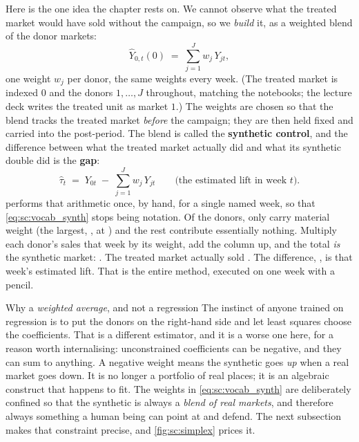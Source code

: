 Here is the one idea the chapter rests on. We cannot observe what the treated market would have
sold without the campaign, so we \emph{build} it, as a weighted blend of the donor markets:
%
\begin{equation}
  \widehat{Y}_{0,t}(0) \;=\; \sum_{j=1}^{J} w_j\, Y_{jt},
  \label{eq:sc:vocab_synth}
\end{equation}
%
one weight $w_j$ per donor, the same weights every week. (The treated market is indexed $0$ and the
donors $1, \dots, J$ throughout, matching the notebooks; the lecture deck writes the treated unit as
market $1$.) The weights are chosen so that the blend
tracks the treated market \emph{before} the campaign; they are then held fixed and carried into
the post-period. The blend is called the \textbf{synthetic control}, and the difference between
what the treated market actually did and what its synthetic double did is the \textbf{gap}:
%
\begin{equation}
  \hat\tau_t \;=\; Y_{0t} \;-\; \sum_{j=1}^{J} w_j\, Y_{jt}
  \qquad\text{(the estimated lift in week } t).
  \label{eq:sc:vocab_gap}
\end{equation}
%
 performs that arithmetic once, by hand, for a single named week, so that
\cref{eq:sc:vocab_synth} stops being notation. Of the \nbSevenNDonors{} donors, only
\nbSevenDcNDonorsUsed{} carry material weight (the largest, \nbSevenDcTopName{}, at
\nbSevenDcTopWeight{}) and the rest contribute essentially nothing. Multiply each donor's sales
that week by its weight, add the column up, and the total \emph{is} the synthetic market:
\keur{\nbSevenDcSynth}. The treated market actually sold \keur{\nbSevenDcActual}. The difference,
\keur{\nbSevenDcGap}, is that week's estimated lift. That is the entire method, executed on one
week with a pencil.



\begin{intuition}{Why a \emph{weighted average}, and not a regression}
The instinct of anyone trained on regression is to put the donors on the right-hand side and let
least squares choose the coefficients. That is a different estimator, and it is a worse one here,
for a reason worth internalising: unconstrained coefficients can be negative, and they can sum to
anything. A negative weight means the synthetic goes \emph{up} when a real market goes down. It
is no longer a portfolio of real places; it is an algebraic construct that happens to fit. The
weights in \cref{eq:sc:vocab_synth} are deliberately confined so that the synthetic is always a
\emph{blend of real markets}, and therefore always something a human being can point at and
defend. The next subsection makes that constraint precise, and \cref{fig:sc:simplex} prices it.
\end{intuition}

